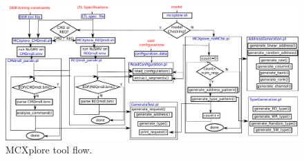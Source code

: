\begin{figure}[tp]
\begin{center}
\includegraphics[scale=0.35]{MCXplore_flow.pdf}
\end{center}
\caption{MCXplore tool flow.~\label{fig:flow}}
\end{figure}